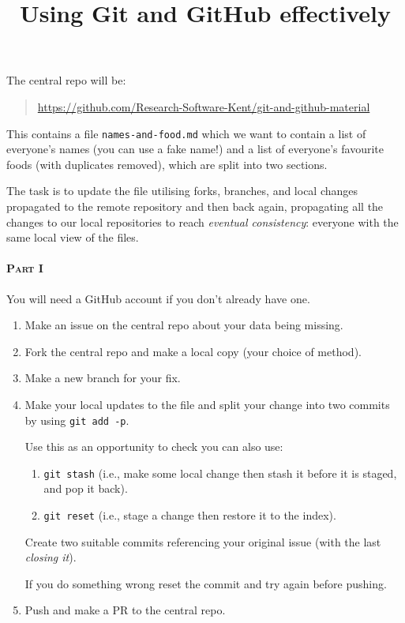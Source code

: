 \documentclass[a4paper]{article}
\title{Using Git and GitHub effectively}
\date{}
\begin{document}
\maketitle

\noindent
The central repo will be:

\begin{quote}
\url{https://github.com/Research-Software-Kent/git-and-github-material}
\end{quote}

This contains a file \texttt{names-and-food.md} which we want to contain a list of everyone's names (you can use a fake name!) and a list of everyone's favourite foods (with duplicates removed), which are split into two sections.

The task is to update the file utilising forks, branches, and local changes propagated to the remote repository and then back again, propagating all the changes to our local repositories to reach \emph{eventual consistency}: everyone with the same local view of the files.

\paragraph{ \textsc{Part I}} You will need a GitHub account if you don't
already have one.

\begin{enumerate}
\item Make an issue on the central repo about your data being missing.
\item Fork the central repo and make a local copy (your choice of method).
\item Make a new branch for your fix.
\item Make your local updates to the file and split your change into two commits by using \texttt{git add -p}.

Use this as an opportunity to check you can also use:

\begin{enumerate}
\item \texttt{git stash} (i.e., make some local change then stash it
before it is staged, and pop it back).
\item \texttt{git reset} (i.e., stage a change then restore it to the index).
\end{enumerate}

Create two suitable commits referencing your original issue (with
the last \emph{closing it}).

If you do something wrong reset the commit and try again before pushing.

\item Push and make a PR to the central repo.
\end{enumerate}
\end{document}
